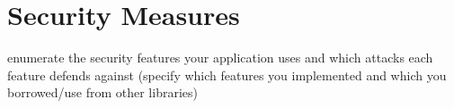 \chapter{Security Measures}\label{chapter:security_measures}

enumerate the security features your application uses and which attacks each feature defends against (specify which features you implemented and which you borrowed/use from
other libraries)